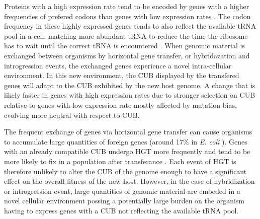 \documentclass[12pt]{article}
\begin{document}
Proteins with a high expression rate tend to be encoded by genes with a higher frequencies of prefered codons than genes with low expression rates \citep{grantham1981, ikemura1985, sharp1987, sharp1988, wallace2013, gilchrist2015}.
The codon frequency in these highly expressed genes tends to also reflect the available tRNA pool in a cell, matching more abundant tRNA to reduce the time the ribosome has to wait until the correct tRNA is encountered \citep{dong1996, dosreis2004}.
When genomic material is exchanged between organisms by horizontal gene transfer, or hybridazation and introgression events, the exchanged genes experience a novel intra-cellular environment.
In this new environment, the CUB displayed by the transfered genes will adapt to the CUB exhibited by the new host genome. 
A change that is likely faster in genes with high expression rates due to stronger selection on CUB relative to genes with low expression rate mostly affected by mutation bias, evolving more neutral with respect to CUB.

The frequent exchange of genes via horizontal gene transfer can cause organisms to accumulate large quantities of foreign genes (around 17\% in \textit{E. coli} \citep{lawrence1997}).
Genes with an already compatible CUB undergo HGT more frequently and tend to be more likely to fix in a population after transferance \citep{tuller2011}.
Each event of HGT is therefore unlikely to alter the CUB of the genome enough to have a significant effect on the overall fitness of the new host. 
However, in the case of hybridization or introgression event, large quantities of genomic material are embeded in a novel cellular environment possing a potentially large burden on the organism having to express genes with a CUB not reflecting the available tRNA pool.
 
\end{document}

